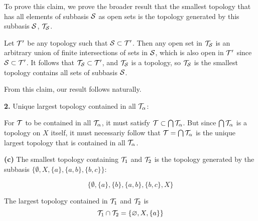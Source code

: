 \documentclass[a4paper, 12pt]{article}
\begin{document}
\begin{solution}
    To prove this claim, we prove the broader result that the smallest topology that has all elements of subbasis $\mathcal{S}$ as open sets is the topology generated by this subbasis $\mathcal{S}$, $\mathcal{T}_{\mathcal{S}}$.

    Let $\mathcal{T}'$ be any topology such that $\mathcal{S} \subset \mathcal{T}'$. Then any open set in $\mathcal{T}_{\mathcal{S}}$ is an arbitrary union of finite intersections of sets in $\mathcal{S}$, which is also open in $\mathcal{T}'$ since $\mathcal{S} \subset \mathcal{T}'$. It follows that $\mathcal{T}_{\mathcal{S}} \subset \mathcal{T}'$, and $\mathcal{T}_{\mathcal{S}}$ is a topology, so $\mathcal{T}_{\mathcal{S}}$ is the smallest topology contains all sets of subbasis $\mathcal{S}$.

    From this claim, our result follows naturally.

    \textbf{2.} Unique largest topology contained in all $\mathcal{T}_\alpha$:

    For $\mathcal{T}$ to be contained in all $\mathcal{T}_\alpha$, it must satisfy $\mathcal{T} \subset \bigcap \mathcal{T}_\alpha$. But since $\bigcap \mathcal{T}_\alpha$ is a topology on $X$ itself, it must necessariy follow that $\mathcal{T} = \bigcap \mathcal{T}_\alpha$ is the unique largest topology that is contained in all $\mathcal{T}_\alpha$.
    
    
    \textbf{(c)}
    The smallest topology containing $\mathcal{T}_1$ and $\mathcal{T}_2$ is the topology generated by the subbasis $\{\emptyset, X, \{a\}, \{a, b\}, \{b, c\}\}$:
    
    \begin{equation*}
    \{\emptyset, \{a\}, \{b\}, \{a, b\}, \{b, c\}, X\}
    \end{equation*}
    
    The largest topology contained in $\mathcal{T}_1 $ and $\mathcal{T}_2$ is \begin{equation*}
    \mathcal{T}_1 \cap \mathcal{T}_2 = \{\varnothing, X, \{a\}\}
    \end{equation*}
\end{solution}
\end{document}
